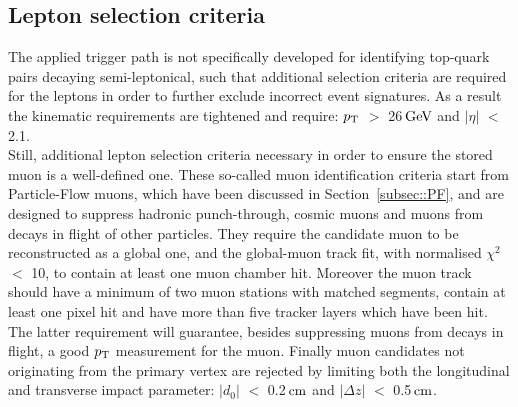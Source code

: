 \subsection{Lepton selection criteria}
The applied trigger path is not specifically developed for identifying top-quark pairs decaying semi-leptonical, such that additional selection criteria are required for the leptons in order to further exclude incorrect event signatures. As a result the kinematic requirements are tightened and require: $p_{\rm T}$ $>$ 26$\, \mathrm{GeV}$ and $\vert \eta \vert$ $<$ 2.1.
\\
Still, additional lepton selection criteria necessary in order to ensure the stored muon is a well-defined one.
These so-called muon identification criteria start from Particle-Flow muons, which have been discussed in Section~\ref{subsec::PF}, and are designed to suppress hadronic punch-through, cosmic muons and muons from decays in flight of other particles.
They require the candidate muon to be reconstructed as a global one, and the global-muon track fit, with normalised $\chi^{2}$ $<$ 10, to contain at least one muon chamber hit.
Moreover the muon track should have a minimum of two muon stations with matched segments, contain at least one pixel hit and have more than five tracker layers which have been hit. The latter requirement will guarantee, besides suppressing muons from decays in flight, a good $p_{\rm T}$ measurement for the muon.
Finally muon candidates not originating from the primary vertex are rejected by limiting both the longitudinal and transverse impact parameter: $\vert d_0 \vert$ $<$ 0.2$\, \mathrm{cm}$ and $\vert \Delta z \vert$ $<$ 0.5$\, \mathrm{cm}$.

